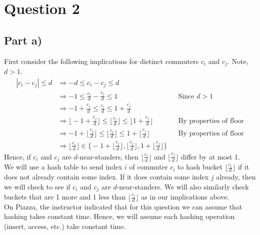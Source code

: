 \documentclass[12pt]{article}
\begin{document}
\newpage

\section*{Question 2}

\subsection*{Part a)}

First consider the following implications for distinct commuters $c_i$ and $c_j$. Note, $d > 1$.
\begin{align*}
|c_i - c_j| \leq d &\Rightarrow -d \leq c_i - c_j \leq d \\
&\Rightarrow -1 \leq \frac{c_i}{d} - \frac{c_j}{d} \leq 1 &&\text{Since $d > 1$} \\
&\Rightarrow -1 + \frac{c_j}{d} \leq \frac{c_i}{d} \leq 1 + \frac{c_j}{d} \\
&\Rightarrow \Big\lfloor -1 + \frac{c_j}{d} \Big\rfloor \leq \Big\lfloor \frac{c_i}{d} \Big\rfloor \leq \Big\lfloor 1 + \frac{c_j}{d} \Big\rfloor &&\text{By properties of floor} \\
&\Rightarrow -1 + \Big\lfloor  \frac{c_j}{d} \Big\rfloor \leq \Big\lfloor \frac{c_i}{d} \Big\rfloor \leq  1 + \Big\lfloor \frac{c_j}{d} \Big\rfloor &&\text{By properties of floor} \\
&\Rightarrow \Big\lfloor \frac{c_i}{d} \Big\rfloor \in \Bigg\{ -1 + \Big\lfloor \frac{c_j}{d} \Big\rfloor, \Big\lfloor \frac{c_j}{d} \Big\rfloor, 1 + \Big\lfloor \frac{c_j}{d} \Big\rfloor \Bigg\}
\end{align*}
Hence, if $c_i$ and $c_j$ are $d$-near-standers, then $\Big\lfloor \frac{c_i}{d} \Big\rfloor$ and $\Big\lfloor  \frac{c_j}{d} \Big\rfloor$ differ by at most 1. \\

We will use a hash table to send index $i$ of commuter $c_i$ to hash bucket $\Big\lfloor \frac{c_i}{d} \Big\rfloor$ if it does not already contain some index. If it does contain some index $j$ already, then we will check to see if $c_i$ and $c_j$ are $d$-near-standers. We will also similarly check buckets that are 1 more and 1 less than $\Big\lfloor \frac{c_i}{d} \Big\rfloor$ as in our implications above. \\

On Piazza, the instructor indicated that for this question we can assume that hashing takes constant time. Hence, we will assume each hashing operation (insert, access, etc.) take constant time. \\
\end{document}

